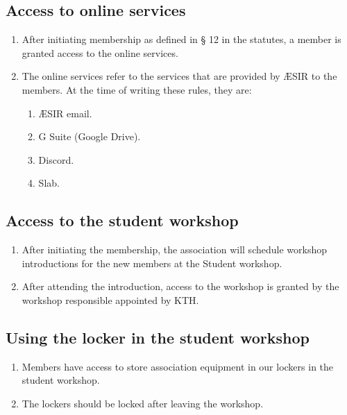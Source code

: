 
\subsection{Access to online services}
\begin{enumerate}
  \item After initiating membership as defined in § 12 in the statutes, a member is granted access to the online services.
  \item The online services refer to the services that are provided by ÆSIR to the members. At the time of writing these rules, they are:
  \begin{enumerate}
    \item ÆSIR email.
    \item G Suite (Google Drive).
    \item Discord.
    \item Slab.
  \end{enumerate}
\end{enumerate}

\subsection{Access to the student workshop}
\begin{enumerate}
  \item After initiating the membership, the association will schedule workshop introductions for the new members at the Student workshop.
  \item After attending the introduction, access to the workshop is granted by the workshop responsible appointed by KTH.
\end{enumerate}

\subsection{Using the locker in the student workshop}
\begin{enumerate}
  \item Members have access to store association equipment in our lockers in the student workshop.
  \item The lockers should be locked after leaving the workshop.
\end{enumerate}

